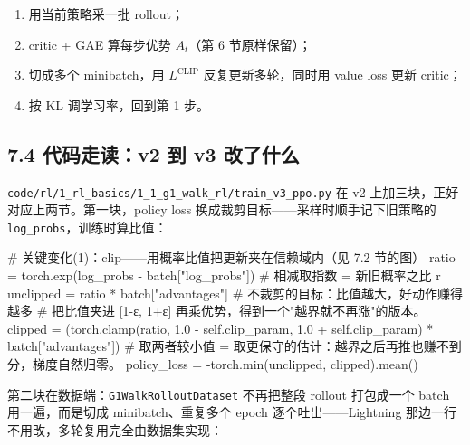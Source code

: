 \documentclass[
  chinese,
]{ctexart}
\newenvironment{Shaded}{\begin{snugshade}}{\end{snugshade}}
\newcommand{\BuiltInTok}[1]{\textcolor[rgb]{0.00,0.23,0.31}{#1}}
\newcommand{\CommentTok}[1]{\textcolor[rgb]{0.37,0.37,0.37}{#1}}
\newcommand{\FloatTok}[1]{\textcolor[rgb]{0.68,0.00,0.00}{#1}}
\newcommand{\NormalTok}[1]{\textcolor[rgb]{0.00,0.23,0.31}{#1}}
\newcommand{\OperatorTok}[1]{\textcolor[rgb]{0.37,0.37,0.37}{#1}}
\newcommand{\StringTok}[1]{\textcolor[rgb]{0.13,0.47,0.30}{#1}}
\newcommand{\VariableTok}[1]{\textcolor[rgb]{0.07,0.07,0.07}{#1}}
\providecommand{\tightlist}{%
  \setlength{\itemsep}{0pt}\setlength{\parskip}{0pt}}
\begin{document}
\begin{enumerate}
\def\labelenumi{\arabic{enumi}.}
\tightlist
\item
  用当前策略采一批 rollout；
\item
  critic + GAE 算每步优势 \(A_t\)（第 6 节原样保留）；
\item
  切成多个 minibatch，用 \(L^{\text{CLIP}}\) 反复更新多轮，同时用 value
  loss 更新 critic；
\item
  按 KL 调学习率，回到第 1 步。
\end{enumerate}

\subsection{7.4 代码走读：v2 到 v3
改了什么}\label{ux4ee3ux7801ux8d70ux8bfbv2-ux5230-v3-ux6539ux4e86ux4ec0ux4e48}

\texttt{code/rl/1\_rl\_basics/1\_1\_g1\_walk\_rl/train\_v3\_ppo.py} 在
v2 上加三块，正好对应上两节。第一块，policy loss
换成裁剪目标------采样时顺手记下旧策略的
\texttt{log\_probs}，训练时算比值：

\begin{Shaded}
\begin{Highlighting}[]
\CommentTok{\# 关键变化(1)：clip——用概率比值把更新夹在信赖域内（见 7.2 节的图）}
\NormalTok{        ratio }\OperatorTok{=}\NormalTok{ torch.exp(log\_probs }\OperatorTok{{-}}\NormalTok{ batch[}\StringTok{"log\_probs"}\NormalTok{])    }\CommentTok{\# 相减取指数 = 新旧概率之比 r}
\NormalTok{        unclipped }\OperatorTok{=}\NormalTok{ ratio }\OperatorTok{*}\NormalTok{ batch[}\StringTok{"advantages"}\NormalTok{]    }\CommentTok{\# 不裁剪的目标：比值越大，好动作赚得越多}
        \CommentTok{\# 把比值夹进 [1{-}ε, 1+ε] 再乘优势，得到一个"越界就不再涨"的版本。}
\NormalTok{        clipped }\OperatorTok{=}\NormalTok{ (torch.clamp(ratio, }\FloatTok{1.0} \OperatorTok{{-}} \VariableTok{self}\NormalTok{.clip\_param, }\FloatTok{1.0} \OperatorTok{+} \VariableTok{self}\NormalTok{.clip\_param)}
                   \OperatorTok{*}\NormalTok{ batch[}\StringTok{"advantages"}\NormalTok{])}
        \CommentTok{\# 取两者较小值 = 取更保守的估计：越界之后再推也赚不到分，梯度自然归零。}
\NormalTok{        policy\_loss }\OperatorTok{=} \OperatorTok{{-}}\NormalTok{torch.}\BuiltInTok{min}\NormalTok{(unclipped, clipped).mean()}
\end{Highlighting}
\end{Shaded}

第二块在数据端：\texttt{G1WalkRolloutDataset} 不再把整段 rollout
打包成一个 batch 用一遍，而是切成 minibatch、重复多个 epoch
逐个吐出------Lightning 那边一行不用改，多轮复用完全由数据集实现：
\end{document}
